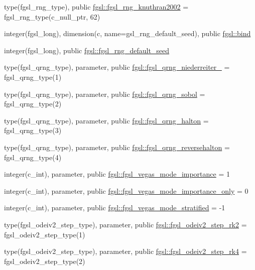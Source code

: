 \begin{DoxyCompactItemize}
\item 
type(fgsl\+\_\+rng\+\_\+type), public \hyperlink{namespacefgsl_a4148e5146be887be4fac343f69ce9399}{fgsl\+::fgsl\+\_\+rng\+\_\+knuthran2002} = fgsl\+\_\+rng\+\_\+type(c\+\_\+null\+\_\+ptr, 62)
\item 
integer(fgsl\+\_\+long), dimension(c, name=\textquotesingle{}gsl\+\_\+rng\+\_\+default\+\_\+seed\textquotesingle{}), public \hyperlink{namespacefgsl_a64406a5e119fa92e47b1adcddb152e91}{fgsl\+::bind}
\item 
integer(fgsl\+\_\+long), public \hyperlink{namespacefgsl_a26af265921be65d7d401bd4865dfe221}{fgsl\+::fgsl\+\_\+rng\+\_\+default\+\_\+seed}
\item 
type(fgsl\+\_\+qrng\+\_\+type), parameter, public \hyperlink{namespacefgsl_a3b034ddb20e620b652a5fe35050c0beb}{fgsl\+::fgsl\+\_\+qrng\+\_\+niederreiter\+\_} = fgsl\+\_\+qrng\+\_\+type(1)
\item 
type(fgsl\+\_\+qrng\+\_\+type), parameter, public \hyperlink{namespacefgsl_ae1c1dcc2273c7307b2f972c9f04ab69f}{fgsl\+::fgsl\+\_\+qrng\+\_\+sobol} = fgsl\+\_\+qrng\+\_\+type(2)
\item 
type(fgsl\+\_\+qrng\+\_\+type), parameter, public \hyperlink{namespacefgsl_a0d865a8d73c002f671f6e1bc1727966c}{fgsl\+::fgsl\+\_\+qrng\+\_\+halton} = fgsl\+\_\+qrng\+\_\+type(3)
\item 
type(fgsl\+\_\+qrng\+\_\+type), parameter, public \hyperlink{namespacefgsl_a871225c291532b659185f193d97a976a}{fgsl\+::fgsl\+\_\+qrng\+\_\+reversehalton} = fgsl\+\_\+qrng\+\_\+type(4)
\item 
integer(c\+\_\+int), parameter, public \hyperlink{namespacefgsl_a40718f473b729ccccca99b83b15569f1}{fgsl\+::fgsl\+\_\+vegas\+\_\+mode\+\_\+importance} = 1
\item 
integer(c\+\_\+int), parameter, public \hyperlink{namespacefgsl_a8b3b603c4ff1fa9726169eaeb1617cf4}{fgsl\+::fgsl\+\_\+vegas\+\_\+mode\+\_\+importance\+\_\+only} = 0
\item 
integer(c\+\_\+int), parameter, public \hyperlink{namespacefgsl_a03809231ad730f80ecda79c11940298e}{fgsl\+::fgsl\+\_\+vegas\+\_\+mode\+\_\+stratified} = -\/1
\item 
type(fgsl\+\_\+odeiv2\+\_\+step\+\_\+type), parameter, public \hyperlink{namespacefgsl_a3f76db1b3a7cdaa6b00e64515d6641b0}{fgsl\+::fgsl\+\_\+odeiv2\+\_\+step\+\_\+rk2} = fgsl\+\_\+odeiv2\+\_\+step\+\_\+type(1)
\item 
type(fgsl\+\_\+odeiv2\+\_\+step\+\_\+type), parameter, public \hyperlink{namespacefgsl_a3d8617454e04b4450cc8c8f3101ff504}{fgsl\+::fgsl\+\_\+odeiv2\+\_\+step\+\_\+rk4} = fgsl\+\_\+odeiv2\+\_\+step\+\_\+type(2)

\end{DoxyCompactItemize}
